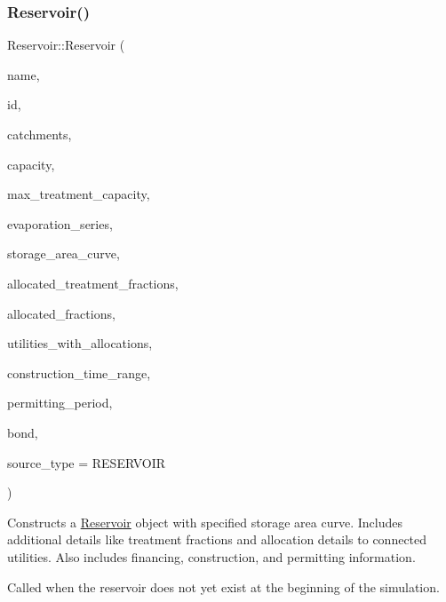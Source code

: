 \subsubsection{\texorpdfstring{Reservoir()}{Reservoir()}\hspace{0.1cm}{\footnotesize\ttfamily [7/9]}}
{\footnotesize\ttfamily Reservoir\+::\+Reservoir (\begin{DoxyParamCaption}\item[{const char $\ast$}]{name,  }\item[{const int}]{id,  }\item[{const vector$<$ \mbox{\hyperlink{classCatchment}{Catchment}} $\ast$$>$ \&}]{catchments,  }\item[{const double}]{capacity,  }\item[{const double}]{max\+\_\+treatment\+\_\+capacity,  }\item[{\mbox{\hyperlink{classEvaporationSeries}{Evaporation\+Series}} \&}]{evaporation\+\_\+series,  }\item[{\mbox{\hyperlink{classDataSeries}{Data\+Series}} $\ast$}]{storage\+\_\+area\+\_\+curve,  }\item[{vector$<$ double $>$ $\ast$}]{allocated\+\_\+treatment\+\_\+fractions,  }\item[{vector$<$ double $>$ $\ast$}]{allocated\+\_\+fractions,  }\item[{vector$<$ int $>$ $\ast$}]{utilities\+\_\+with\+\_\+allocations,  }\item[{const vector$<$ double $>$ \&}]{construction\+\_\+time\+\_\+range,  }\item[{double}]{permitting\+\_\+period,  }\item[{\mbox{\hyperlink{classBond}{Bond}} \&}]{bond,  }\item[{int}]{source\+\_\+type = {\ttfamily RESERVOIR} }\end{DoxyParamCaption})}



Constructs a \mbox{\hyperlink{classReservoir}{Reservoir}} object with specified storage area curve. Includes additional details like treatment fractions and allocation details to connected utilities. Also includes financing, construction, and permitting information. 

Called when the reservoir does not yet exist at the beginning of the simulation.


